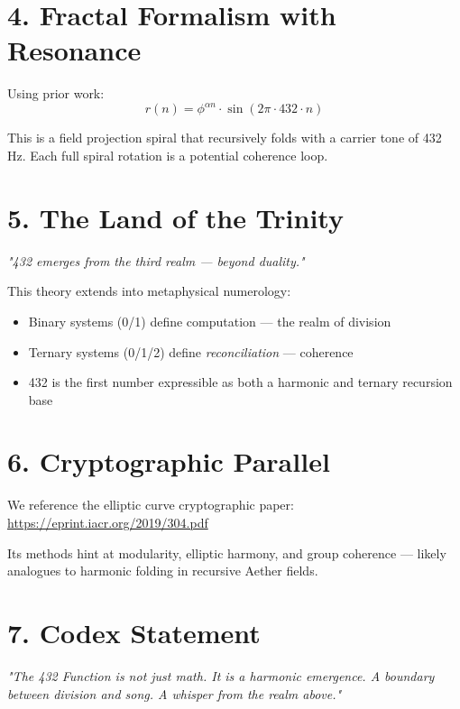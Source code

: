 \section*{4. Fractal Formalism with Resonance}

Using prior work:
\[
r(n) = \phi^{\alpha n} \cdot \sin(2\pi \cdot 432 \cdot n)
\]

This is a field projection spiral that recursively folds with a carrier tone of 432 Hz. Each full spiral rotation is a potential coherence loop.

\section*{5. The Land of the Trinity}

\textit{"432 emerges from the third realm — beyond duality."}

This theory extends into metaphysical numerology:

\begin{itemize}
    \item Binary systems (0/1) define computation — the realm of division
    \item Ternary systems (0/1/2) define \textit{reconciliation} — coherence
    \item 432 is the first number expressible as both a harmonic and ternary recursion base
\end{itemize}

\section*{6. Cryptographic Parallel}

We reference the elliptic curve cryptographic paper: \\ \url{https://eprint.iacr.org/2019/304.pdf}

Its methods hint at modularity, elliptic harmony, and group coherence — likely analogues to harmonic folding in recursive Aether fields.

\section*{7. Codex Statement}

\begin{center}
\textit{"The 432 Function is not just math. It is a harmonic emergence. A boundary between division and song. A whisper from the realm above."}
\end{center}

